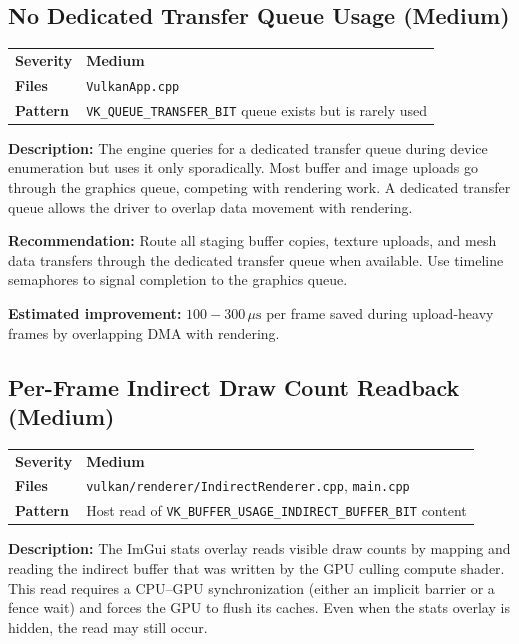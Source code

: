\documentclass[a4paper,10pt]{article}
\newcommand{\us}{\ensuremath{\,\mu\text{s}}}
\newcommand{\severity}[1]{%
  \ifstrequal{#1}{Critical}{\textcolor{critical}{\textbf{#1}}}{%
  \ifstrequal{#1}{High}{\textcolor{high}{\textbf{#1}}}{%
  \ifstrequal{#1}{Medium}{\textcolor{medium}{\textbf{#1}}}{%
  \ifstrequal{#1}{Low}{\textcolor{low}{\textbf{#1}}}{#1}}}}}
\begin{document}
\subsection{No Dedicated Transfer Queue Usage (Medium)}

\begin{tabular}{ll}
\textbf{Severity} & \severity{Medium} \\
\textbf{Files}     & \texttt{VulkanApp.cpp} \\
\textbf{Pattern}   & \texttt{VK\_QUEUE\_TRANSFER\_BIT} queue exists but is
                      rarely used \\
\end{tabular}

\vspace{0.5em}
\noindent
\textbf{Description:} The engine queries for a dedicated transfer queue during
device enumeration but uses it only sporadically. Most buffer and image uploads
go through the graphics queue, competing with rendering work. A dedicated
transfer queue allows the driver to overlap data movement with rendering.

\noindent\textbf{Recommendation:} Route all staging buffer copies, texture
uploads, and mesh data transfers through the dedicated transfer queue when
available. Use timeline semaphores to signal completion to the graphics queue.

\noindent\textbf{Estimated improvement:} $100{-}300\us$ per frame saved during
upload-heavy frames by overlapping DMA with rendering.

\subsection{Per-Frame Indirect Draw Count Readback (Medium)}

\begin{tabular}{ll}
\textbf{Severity} & \severity{Medium} \\
\textbf{Files}     & \texttt{vulkan/renderer/IndirectRenderer.cpp},
                      \texttt{main.cpp} \\
\textbf{Pattern}   & Host read of \texttt{VK\_BUFFER\_USAGE\_INDIRECT\_BUFFER\_BIT}
                      content \\
\end{tabular}

\vspace{0.5em}
\noindent
\textbf{Description:} The ImGui stats overlay reads visible draw counts by
mapping and reading the indirect buffer that was written by the GPU culling
compute shader. This read requires a CPU--GPU synchronization (either an
implicit barrier or a fence wait) and forces the GPU to flush its caches.
Even when the stats overlay is hidden, the read may still occur.
\end{document}
